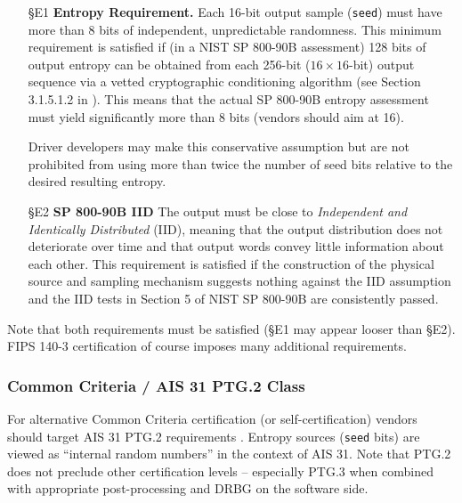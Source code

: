     \begin{itemize}

    \item[\S E1]    {\bf Entropy Requirement.}
    Each 16-bit output sample (\verb|seed|) must have more than 8 bits of
    independent, unpredictable randomness. This minimum requirement is
    satisfied if (in a NIST SP 800-90B \cite{TuBaKe+18} assessment) 128
    bits of output entropy can be obtained from each 256-bit
    ($16 \times 16$-bit)  output sequence via a vetted
    cryptographic conditioning algorithm (see Section 3.1.5.1.2 in
    \cite{TuBaKe+18}). This means that the actual SP 800-90B entropy
    assessment must yield significantly more than 8 bits (vendors should
    aim at 16).

    Driver developers may make this conservative assumption but are not
    prohibited from using more than twice the number of seed bits relative
    to the desired resulting entropy.

    \item[\S E2]    {\bf SP 800-90B IID}
    The output must be close to \emph{Independent and Identically Distributed}
    (IID), meaning that the output distribution does not deteriorate over
    time and that output words convey little information about each other.
    This requirement is satisfied if the construction of the physical source
    and sampling mechanism suggests nothing against the IID assumption
    and the IID tests in Section 5 of NIST SP 800-90B \cite{TuBaKe+18} are
    consistently passed.

    \end{itemize}

    Note that both requirements must be satisfied (\S E1 may appear looser
    than \S E2). FIPS 140-3 certification of course imposes many additional
    requirements.


    \subsubsection{Common Criteria / AIS 31 PTG.2 Class}

    For alternative Common Criteria certification (or self-certification)
    vendors should target AIS 31 PTG.2 requirements \cite[Sect. 4.3.]{KiSc11}.
    Entropy sources (\verb|seed| bits) are viewed as ``internal random
    numbers'' in the context of AIS 31. Note that PTG.2 does not preclude
    other certification levels -- especially PTG.3 when combined with
    appropriate post-processing and DRBG on the software side.

